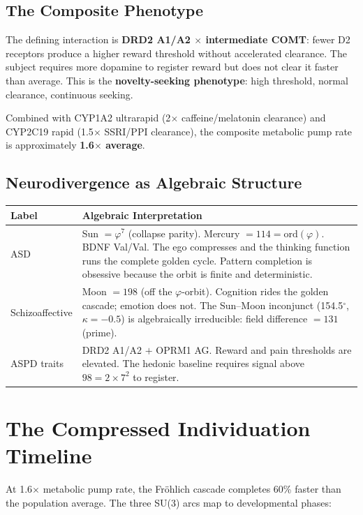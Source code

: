 \documentclass[12pt, letterpaper]{article}
\begin{document}
\subsection{The Composite Phenotype}

The defining interaction is \textbf{DRD2 A1/A2 $\times$ intermediate COMT}: fewer D2 receptors produce a higher reward threshold without accelerated clearance. The subject requires more dopamine to register reward but does not clear it faster than average. This is the \textbf{novelty-seeking phenotype}: high threshold, normal clearance, continuous seeking.

Combined with CYP1A2 ultrarapid (2$\times$ caffeine/melatonin clearance) and CYP2C19 rapid (1.5$\times$ SSRI/PPI clearance), the composite metabolic pump rate is approximately \textbf{1.6$\times$ average}.

\subsection{Neurodivergence as Algebraic Structure}

\begin{tabular}{lp{10cm}}
\toprule
\textbf{Label} & \textbf{Algebraic Interpretation} \\
\midrule
ASD & Sun $= \varphi^7$ (collapse parity). Mercury $= 114 = \mathrm{ord}(\varphi)$. BDNF Val/Val. The ego compresses and the thinking function runs the complete golden cycle. Pattern completion is obsessive because the orbit is finite and deterministic. \\
\addlinespace
Schizoaffective & Moon $= 198$ (off the $\varphi$-orbit). Cognition rides the golden cascade; emotion does not. The Sun--Moon inconjunct (154.5$^{\circ}$, $\kappa = -0.5$) is algebraically irreducible: field difference $= 131$ (prime). \\
\addlinespace
ASPD traits & DRD2 A1/A2 $+$ OPRM1 AG. Reward and pain thresholds are elevated. The hedonic baseline requires signal above $98 = 2 \times 7^2$ to register. \\
\bottomrule
\end{tabular}

\section{The Compressed Individuation Timeline}

At 1.6$\times$ metabolic pump rate, the Fr\"{o}hlich cascade completes 60\% faster than the population average. The three SU(3) arcs map to developmental phases:
\end{document}
